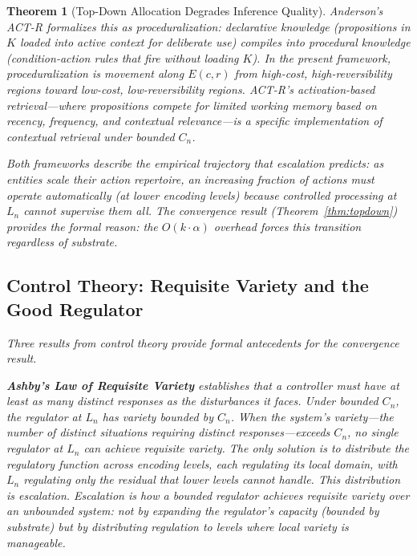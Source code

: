 \documentclass[11pt]{article}
\newtheorem{theorem}{Theorem}
\theoremstyle{definition}
\begin{document}
\begin{theorem}[Top-Down Allocation Degrades Inference Quality]
Anderson's ACT-R \cite{Anderson1993} formalizes this as
proceduralization: declarative knowledge (propositions in $K$ loaded
into active context for deliberate use) compiles into procedural
knowledge (condition-action rules that fire without loading $K$). In
the present framework, proceduralization is movement along $E(c,r)$
from high-cost, high-reversibility regions toward low-cost,
low-reversibility regions. ACT-R's activation-based retrieval---where
propositions compete for limited working memory based on
recency, frequency, and contextual relevance---is a specific
implementation of contextual retrieval under bounded $C_n$.

Both frameworks describe the empirical trajectory that escalation
predicts: as entities scale their action repertoire, an increasing
fraction of actions must operate automatically (at lower encoding
levels) because controlled processing at $L_n$ cannot supervise
them all. The convergence result (Theorem~\ref{thm:topdown}) provides
the formal reason: the $O(k \cdot \alpha)$ overhead forces this
transition regardless of substrate.

\subsection{Control Theory: Requisite Variety and the Good Regulator}

Three results from control theory provide formal antecedents for the
convergence result.

\textbf{Ashby's Law of Requisite Variety} \cite{Ashby1956} establishes
that a controller must have at least as many distinct responses as the
disturbances it faces. Under bounded $C_n$, the regulator at $L_n$ has
variety bounded by $C_n$. When the system's variety---the number of
distinct situations requiring distinct responses---exceeds $C_n$, no
single regulator at $L_n$ can achieve requisite variety. The only
solution is to distribute the regulatory function across encoding
levels, each regulating its local domain, with $L_n$ regulating only
the residual that lower levels cannot handle. This distribution is
escalation. Escalation is how a bounded regulator achieves requisite
variety over an unbounded system: not by expanding the regulator's
capacity (bounded by substrate) but by distributing regulation to
levels where local variety is manageable.


\end{theorem}
\end{document}
